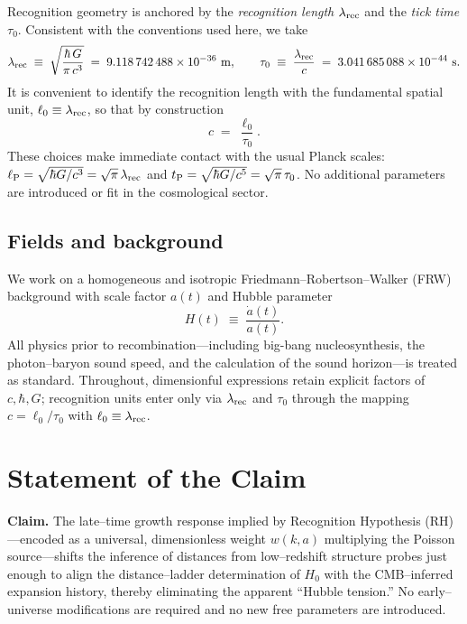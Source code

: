 \documentclass[11pt]{article}
\begin{document}
Recognition geometry is anchored by the \emph{recognition length} \(\lambda_{\rm rec}\) and the \emph{tick time} \(\tau_0\).
Consistent with the conventions used here, we take
\begin{equation*}
\lambda_{\rm rec} \;\equiv\; \sqrt{\frac{\hbar\,G}{\pi\,c^{3}}}
\;=\; 9.118\,742\,488\times 10^{-36}~\mathrm{m},
\qquad
\tau_0 \;\equiv\; \frac{\lambda_{\rm rec}}{c}
\;=\; 3.041\,685\,088\times 10^{-44}~\mathrm{s}.
\end{equation*}
It is convenient to identify the recognition length with the fundamental spatial unit,
\(\ell_0 \equiv \lambda_{\rm rec}\), so that by construction
\begin{equation*}
c \;=\; \frac{\ell_0}{\tau_0}.
\end{equation*}
These choices make immediate contact with the usual Planck scales:
\(\ell_{\rm P}=\sqrt{\hbar G/c^{3}}=\sqrt{\pi}\,\lambda_{\rm rec}\) and
\(t_{\rm P}=\sqrt{\hbar G/c^{5}}=\sqrt{\pi}\,\tau_{0}\).
No additional parameters are introduced or fit in the cosmological sector.

\subsection*{Fields and background}

We work on a homogeneous and isotropic Friedmann--Robertson--Walker (FRW) background with scale factor \(a(t)\) and Hubble parameter
\begin{equation*}
H(t)\;\equiv\;\frac{\dot a(t)}{a(t)}.
\end{equation*}
All physics prior to recombination---including big-bang nucleosynthesis, the photon--baryon sound speed, and the calculation of the sound horizon---is treated as standard.
Throughout, dimensionful expressions retain explicit factors of \(c,\hbar,G\); recognition units enter only via \(\lambda_{\rm rec}\) and \(\tau_0\) through the mapping \(c=\ell_0/\tau_0\) with \(\ell_0\equiv\lambda_{\rm rec}\).

\section{Statement of the Claim}

\textbf{Claim.} The late–time growth response implied by Recognition Hypothesis (RH)---encoded as a universal, dimensionless weight \(w(k,a)\) multiplying the Poisson source---shifts the inference of distances from low–redshift structure probes just enough to align the distance–ladder determination of \(H_0\) with the CMB–inferred expansion history, thereby eliminating the apparent ``Hubble tension.'' No early–universe modifications are required and no new free parameters are introduced.
\end{document}
